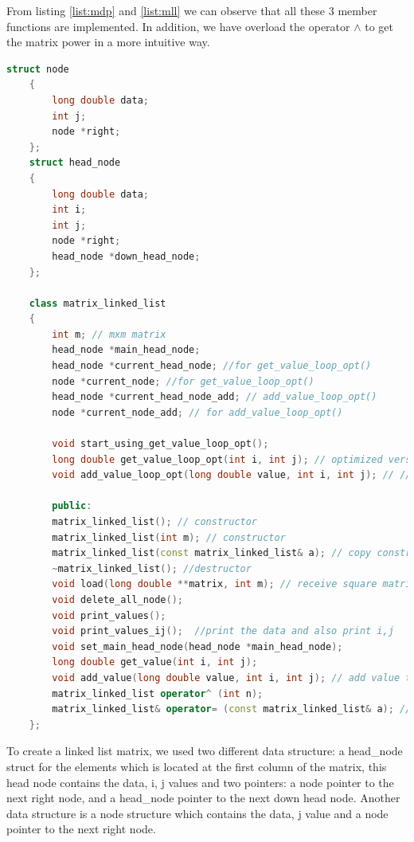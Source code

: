\documentclass[12pt]{article}
\begin{document}
From listing \ref{list:mdp} and \ref{list:mll} we can observe that all these 3 member functions are implemented. In addition, we have overload the operator $\wedge$ to get the matrix power in a more intuitive way. 
      
    
    \begin{lstlisting}[language=c++, caption={matrix\_linked\_list class}, label={list:mll}]    
    struct node
    {
        long double data;
        int j;
        node *right;
    };
    struct head_node
    {
        long double data;
        int i;
        int j;
        node *right;
        head_node *down_head_node;
    };
    
    class matrix_linked_list
    {
        int m; // mxm matrix
        head_node *main_head_node;
        head_node *current_head_node; //for get_value_loop_opt()
        node *current_node; //for get_value_loop_opt()
        head_node *current_head_node_add; // add_value_loop_opt()
        node *current_node_add; // for add_value_loop_opt()
        
        void start_using_get_value_loop_opt();
        long double get_value_loop_opt(int i, int j); // optimized version of get_value (make the loop faster using temp node address)
        void add_value_loop_opt(long double value, int i, int j); // // optimized version of add_value (make the loop faster using temp node address)
        
        public:
        matrix_linked_list(); // constructor 
        matrix_linked_list(int m); // constructor 
        matrix_linked_list(const matrix_linked_list& a); // copy constructor for return
        ~matrix_linked_list(); //destructor
        void load(long double **matrix, int m); // receive square matrix and size mxm
        void delete_all_node();
        void print_values();
        void print_values_ij();  //print the data and also print i,j 
        void set_main_head_node(head_node *main_head_node);
        long double get_value(int i, int j);
        void add_value(long double value, int i, int j); // add value to the existing i,j if not -> create new node
        matrix_linked_list operator^ (int n);
        matrix_linked_list& operator= (const matrix_linked_list& a); // assigment
    };
\end{lstlisting}    

To create a linked list matrix, we used two different data structure: a head\_node struct for the elements which is located at the first column of the matrix, this head node contains the data, i, j values and two pointers: a node pointer to the next right node, and a head\_node pointer to the next down head node. Another data structure is a node structure which contains the data, j value and a node pointer to the next right node.
\end{document}
